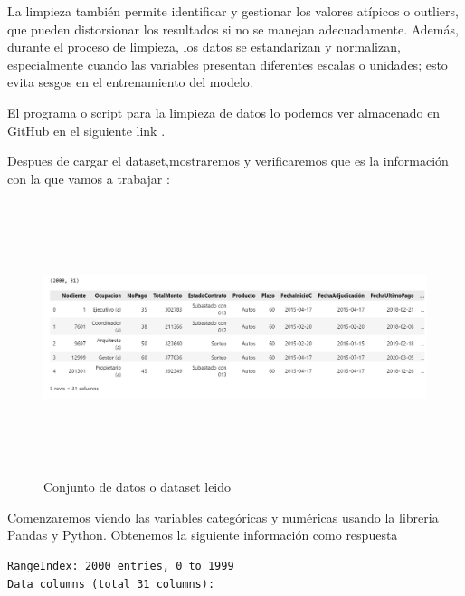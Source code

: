 La limpieza también permite identificar y gestionar los valores atípicos o outliers, que pueden 
distorsionar los resultados si no se manejan adecuadamente. Además, durante el proceso de 
limpieza, los datos se estandarizan y normalizan, especialmente cuando las variables presentan 
diferentes escalas o unidades; esto evita sesgos en el entrenamiento del modelo. \medskip

El programa o script para la limpieza de datos lo podemos ver almacenado en GitHub en el siguiente link \cite{roh1} . \medskip

Despues de cargar el dataset,mostraremos y verificaremos que es la información con la que vamos a trabajar : \medskip

\begin{figure}[H]
    \centering
       \includegraphics[width=14cm, height=8cm ]{Imagenes/DatasetLeido.PNG }
      \caption{Conjunto de datos o dataset leido}
      \label{fig:datasetl}
\end{figure}



Comenzaremos viendo las variables categóricas y numéricas usando la libreria Pandas y Python. Obtenemos la siguiente información como respuesta
\newpage
\begin{verbatim}
RangeIndex: 2000 entries, 0 to 1999 
Data columns (total 31 columns):
\end{verbatim}

